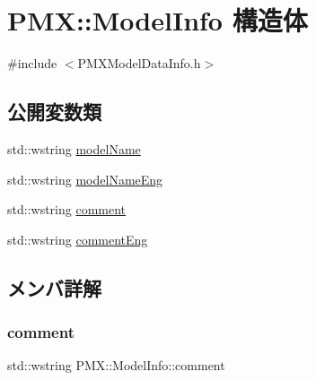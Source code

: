 \hypertarget{struct_p_m_x_1_1_model_info}{}\section{P\+MX\+:\+:Model\+Info 構造体}
\label{struct_p_m_x_1_1_model_info}


{\ttfamily \#include $<$P\+M\+X\+Model\+Data\+Info.\+h$>$}

\subsection*{公開変数類}
\begin{DoxyCompactItemize}
\item 
std\+::wstring \mbox{\hyperlink{struct_p_m_x_1_1_model_info_aef4b5c31db4a895d72c82d8e9f762037}{model\+Name}}
\item 
std\+::wstring \mbox{\hyperlink{struct_p_m_x_1_1_model_info_a39f11c83c092fe840ceef5ce466c003f}{model\+Name\+Eng}}
\item 
std\+::wstring \mbox{\hyperlink{struct_p_m_x_1_1_model_info_adf2493db6d2f467f1f71e91b148ba8a9}{comment}}
\item 
std\+::wstring \mbox{\hyperlink{struct_p_m_x_1_1_model_info_ae58370a2e85443fa2a60a90eacc92826}{comment\+Eng}}
\end{DoxyCompactItemize}


\subsection{メンバ詳解}
\mbox{\label{struct_p_m_x_1_1_model_info_adf2493db6d2f467f1f71e91b148ba8a9}} 
\subsubsection{\texorpdfstring{comment}{comment}}
{\footnotesize\ttfamily std\+::wstring P\+M\+X\+::\+Model\+Info\+::comment}

\mbox{\label{struct_p_m_x_1_1_model_info_ae58370a2e85443fa2a60a90eacc92826}} 
